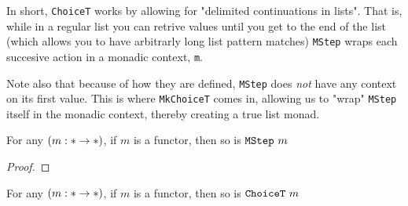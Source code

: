 In short, \verb|ChoiceT| works by allowing for "delimited continuations in lists".
That is, while in a regular list you can retrive values until you get to the end of the list (which allows you to have arbitrarly long list pattern matches) \verb|MStep| wraps each succesive action in a monadic context, \verb|m|.

Note also that because of how they are defined, \verb|MStep| does \emph{not} have any context on its first value.
This is where \verb|MkChoiceT| comes in, allowing us to "wrap" \verb|MStep| itself in the monadic context, thereby creating a true list monad.

\begin{lem}
	For any $(m : \ast \to \ast)$, if $m$ is a functor, then so is $\verb|MStep| \ m$
\end{lem}
\begin{proof}
	
\end{proof}
\begin{thm}
	For any $(m : \ast \to \ast)$, if $m$ is a functor, then so is $\verb|ChoiceT| \ m$
\end{thm}
	